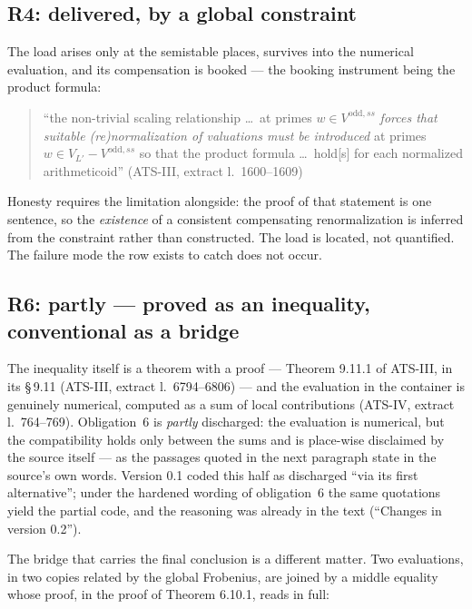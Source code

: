 \documentclass[11pt,a4paper]{article}
\theoremstyle{definition}
\newcommand{\anchor}[2]{(#1, extract l.~#2)}
\begin{document}
\subsection{R4: delivered, by a global constraint}

The load arises only at the semistable places, survives into the numerical
evaluation, and its compensation is booked --- the booking instrument being the
product formula:

\begin{quote}\small
``the non-trivial scaling relationship \dots\ at primes $w \in
V^{\mathrm{odd},ss}$ \emph{forces that suitable (re)normalization of valuations
must be introduced} at primes $w \in V_{L'} - V^{\mathrm{odd},ss}$ so that the
product formula \dots\ hold[s] for each normalized arithmeticoid''
\hfill\anchor{ATS-III}{1600--1609}
\end{quote}

Honesty requires the limitation alongside: the proof of that statement is one
sentence, so the \emph{existence} of a consistent compensating renormalization is
inferred from the constraint rather than constructed. The load is located, not
quantified. The failure mode the row exists to catch does not occur.

\subsection{R6: partly --- proved as an inequality, conventional as a bridge}

The inequality itself is a theorem with a proof --- Theorem 9.11.1 of ATS-III, in
its \S\,9.11 \anchor{ATS-III}{6794--6806} --- and
the evaluation in the container is genuinely numerical, computed as a sum of local
contributions \anchor{ATS-IV}{764--769}. Obligation~6 is \emph{partly}
discharged: the evaluation is numerical, but the compatibility holds only between
the sums and is place-wise disclaimed by the source itself --- as the passages
quoted in the next paragraph state in the source's own words. Version 0.1 coded
this half as discharged ``via its first alternative''; under the hardened
wording of obligation~6 the same quotations yield the partial code, and the
reasoning was already in the text (``Changes in version 0.2'').

The bridge that carries the final conclusion is a different matter. Two
evaluations, in two copies related by the global Frobenius, are joined by a middle
equality whose proof, in the proof of Theorem 6.10.1, reads in full:
\end{document}
